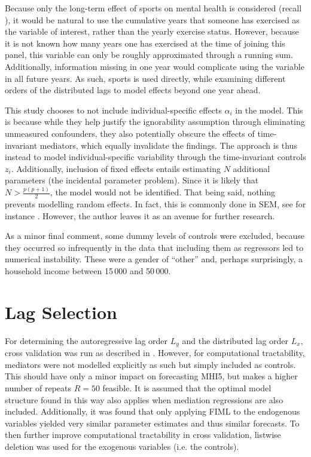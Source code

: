 Because only the long-term effect of sports on mental health is considered (recall ),
it would be natural to use the cumulative years that someone has exercised as the variable of interest, rather than the
yearly exercise status. However, because it is not known how many years one has exercised at the time of joining this panel,
this variable can only be roughly approximated through a running sum. Additionally, information missing in one year would
complicate using the variable in all future years.
As such, sports is used directly, while examining different orders of the distributed lags to model effects beyond
one year ahead.

This study chooses to not include individual-specific effects $\alpha_i$ in the model. This is because while they help justify
the ignorability assumption through eliminating unmeasured confounders, they also potentially obscure the effects of time-invariant mediators,
which equally invalidate the findings. The approach is thus instead to model individual-specific variability through the
time-invariant controls $z_i$. Additionally, inclusion of fixed effects entails estimating $N$ additional parameters
(the incidental parameter problem). Since it is likely that $N > \frac{p(p + 1)}{2}$, the model would not be identified.
That being said, nothing prevents modelling random effects. In fact, this is commonly done in
SEM, see for instance . However, the author leaves it as an avenue for further research.

As a minor final comment, some dummy levels of controls were excluded, because they occurred so infrequently in the data
that including them as regressors led to numerical instability.
These were a gender of ``other'' and, perhaps surprisingly, a household income between 15\,000 and 50\,000.

\section{Lag Selection}
\label{sec:modelling:lags}
For determining the autoregressive lag order $L_y$ and the distributed lag order $L_x$, cross validation was run as
described in .
However, for computational tractability, mediators were not modelled explicitly as such but simply included as controls.
This should have only a minor impact on forecasting MHI5, but makes a higher number of repeats $R = 50$ feasible.
It is assumed that the optimal model structure found in this way also applies when mediation regressions are also
included.
Additionally, it was found that only applying FIML to the endogenous variables yielded very similar parameter estimates
and thus similar forecasts. To then further improve computational tractability in cross validation, listwise deletion
was used for the exogenous variables (i.e. the controls).

